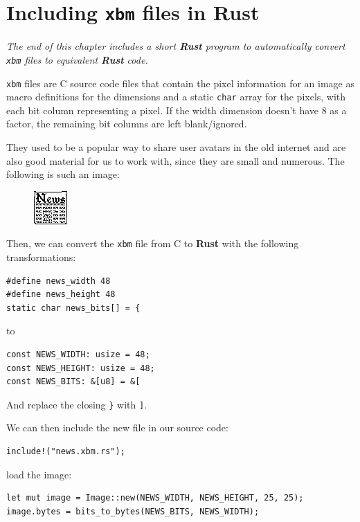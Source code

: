 \documentclass[12pt,openany,a4,usenames,dvipsnames]{book}
\newcommand\pixel{{\pixelfont{}pixel}}
\newcommand\pixels{{\pixelfont{}pixels}}
\newcommand\Rust{{\fira{}\textbf{Rust}}}
\begin{document}
\chapter{Including \texttt{xbm} files in \Rust{}}\label{ch:xbmtors}

\emph{The end of this chapter includes a short \Rust{} program to automatically convert \texttt{xbm} files to equivalent \Rust{} code.}

\texttt{xbm} files are C source code files that contain the \pixel{} information for an image as macro definitions for the dimensions and a static \texttt{char} array for the \pixels{}, with each bit column representing a pixel. If the width dimension doesn't have 8 as a factor, the remaining bit columns are left blank/ignored.

They used to be a popular way to share user avatars in the old internet and are also good material for us to work with, since they are small and numerous. The following is such an image:

\begin{figure}[H]
\centering
\includegraphics{figures/news.png}
\end{figure}
Then, we can convert the \texttt{xbm} file from C to \Rust{} with the following transformations:

\begin{verbatim}
#define news_width 48
#define news_height 48
static char news_bits[] = {
\end{verbatim}

to


\begin{verbatim}
const NEWS_WIDTH: usize = 48;
const NEWS_HEIGHT: usize = 48;
const NEWS_BITS: &[u8] = &[
\end{verbatim}

And replace the closing \texttt{\}} with \texttt{]}.

We can then include the new file in our source code:


\begin{verbatim}
include!("news.xbm.rs");
\end{verbatim}

load the image:

\begin{verbatim}
let mut image = Image::new(NEWS_WIDTH, NEWS_HEIGHT, 25, 25);
image.bytes = bits_to_bytes(NEWS_BITS, NEWS_WIDTH);
\end{verbatim}
\end{document}
